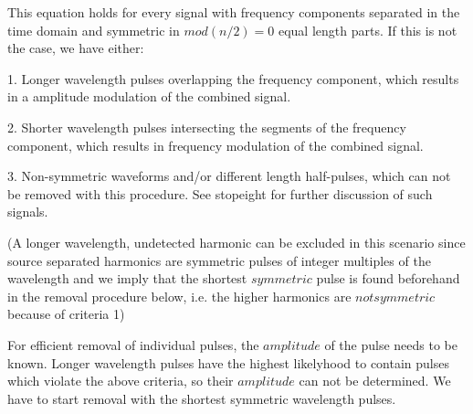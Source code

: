 \documentclass{article}
\renewcommand{\baselinestretch}{2}
\begin{document}
\renewcommand{\baselinestretch}{1}

This equation holds for every signal with frequency components separated in the time domain and symmetric in $mod(n/2)=0$ equal length parts. If this is not the case, we have either:

1. Longer wavelength pulses overlapping the frequency component, which results in a amplitude modulation of the combined signal.

2. Shorter wavelength pulses intersecting the segments of the frequency component, which results in frequency modulation of the combined signal.

3. Non-symmetric waveforms and/or different length half-pulses, which can not be removed with this procedure. See stopeight for further discussion of such signals.

(A longer wavelength, undetected harmonic can be excluded in this scenario since source separated harmonics are symmetric pulses of integer multiples of the wavelength and we imply that the shortest $symmetric$ pulse is found beforehand in the removal procedure below, i.e. the higher harmonics are $not symmetric$ because of criteria 1)

For efficient removal of individual pulses, the $amplitude$ of the pulse needs to be known. Longer wavelength pulses have the highest likelyhood to contain pulses which violate the above criteria, so their $amplitude$ can not be determined. We have to start removal with the shortest symmetric wavelength pulses.
\end{document}
